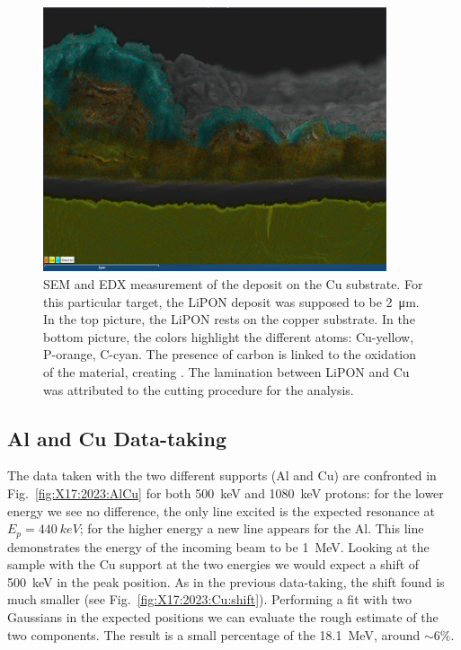 \begin{refsection}
\begin{figure}
            \includegraphics[width = 0.9\textwidth]{Figures/X17/PSI_LiPON-atoms_picture.PNG}
            \caption[SEM EDX LiPON analysis]{SEM and EDX measurement of the  deposit on the Cu substrate. For this particular target, the LiPON deposit was supposed to be \SI{2}{\micro m}. In the top picture, the LiPON rests on the copper substrate. In the bottom picture, the colors highlight the different atoms: Cu-yellow, P-orange, C-cyan. The presence of carbon is linked to the oxidation of the material, creating . The lamination between LiPON and Cu was attributed to the cutting procedure for the analysis.}
            \label{fig:X17:target:LiPON:psi}
        \end{figure}  

    \subsection{Al and Cu Data-taking} 
        The data taken with the two different supports (Al and Cu) are confronted in Fig.~\ref{fig:X17:2023:AlCu} for both \SI{500}{keV} and \SI{1080}{keV} protons: for the lower energy we see no difference, the only line excited is the expected resonance at $E_p=\SI{440}{keV}$; for the higher energy a new line appears for the Al. This line demonstrates the energy of the incoming beam to be \SI{1}{MeV}.
        Looking at the sample with the Cu support at the two energies we would expect a shift of \SI{500}{keV} in the peak position. As in the previous data-taking, the shift found is much smaller (see Fig.~\ref{fig:X17:2023:Cu:shift}). Performing a fit with two Gaussians in the expected positions we can evaluate the rough estimate of the two components. The result is a small percentage of the \SI{18.1}{MeV}, around $\sim6\%$.


\end{refsection}
